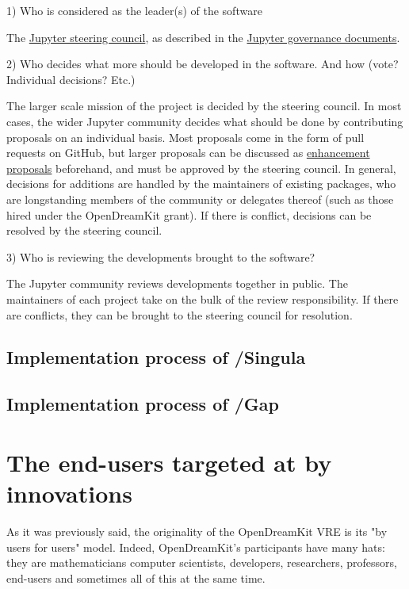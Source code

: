 \documentclass{deliverablereport}
\begin{document}
1)      Who is considered as the leader(s) of the software

The \href{https://jupyter.org/about.html}{Jupyter steering council}, as described in the \href{https://github.com/jupyter/governance}{Jupyter governance documents}.

2)      Who decides what more should be developed in the software. And how (vote? Individual decisions? Etc.)

The larger scale mission of the project is decided by the steering council. In most cases, the wider Jupyter community decides what should be done by contributing proposals on an individual basis. Most proposals come in the form of pull requests on GitHub, but larger proposals can be discussed as \href{https://github.com/jupyter/enhancement-proposals}{enhancement proposals} beforehand, and must be approved by the steering council. In general, decisions for additions are handled by the maintainers of existing packages, who are longstanding members of the community or delegates thereof (such as those hired under the OpenDreamKit grant). If there is conflict, decisions can be resolved by the steering council.

3)      Who is reviewing the developments brought to the software?

The Jupyter community reviews developments together in public. The maintainers of each project take on the bulk of the review responsibility. If there are conflicts, they can be brought to the steering council for resolution.


\subsection{Implementation process of /Singula}
\subsection{Implementation process of /Gap}




\section{The end-users targeted at by innovations}

As it was previously said, the originality of the OpenDreamKit VRE is its "by users for users" model. Indeed, OpenDreamKit's participants have many hats: they are mathematicians computer scientists, developers, researchers, professors, end-users and sometimes all of this at the same time. 
\end{document}
